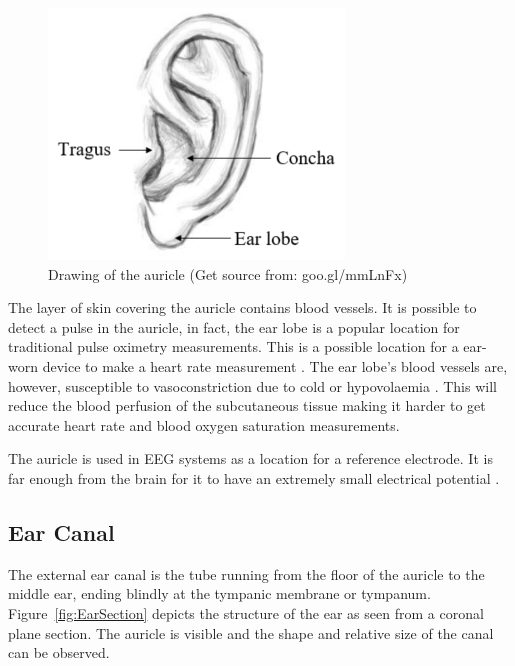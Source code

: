\medskip

\begin{figure}
   \centering
   \includegraphics[scale=1]{figs/AuricleLabel}
   \caption{Drawing of the auricle (Get source from: goo.gl/mmLnFx)}
   \label{fig:AuricleLabel}
\end{figure}

The layer of skin covering the auricle contains blood vessels. It is possible to detect a pulse in the auricle, in fact, the ear lobe is a popular location for traditional pulse oximetry measurements. This is a possible location for a ear-worn device to make a heart rate measurement \citep{poh2010motion}. The ear lobe's blood vessels are, however, susceptible to vasoconstriction due to cold or hypovolaemia \citep{WHO2011UsingPulseOxi}. This will reduce the blood perfusion of the subcutaneous tissue making it harder to get accurate heart rate and blood oxygen saturation measurements.

\medskip

The auricle is used in EEG systems as a location for a reference electrode. It is far enough from the brain for it to have an extremely small electrical potential \citep{nunez2006electric}.

\subsection{Ear Canal}
The external ear canal is the tube running from the floor of the auricle to the middle ear, ending blindly at the tympanic membrane or tympanum. Figure~\ref{fig:EarSection} depicts the structure of the ear as seen from a coronal plane section. The auricle is visible and the shape and relative size of the canal can be observed.

\medskip

